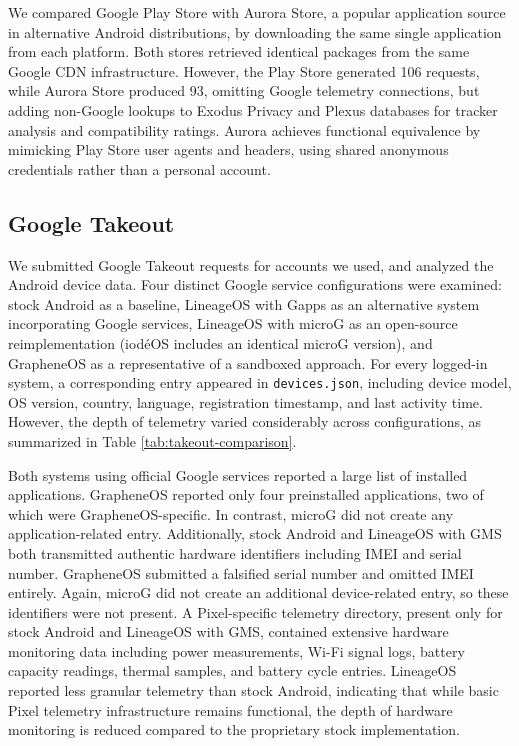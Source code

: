 We compared Google Play Store with Aurora Store, a popular application source in alternative Android distributions, by downloading the same single application from each platform. Both stores retrieved identical packages from the same Google CDN infrastructure. However, the Play Store generated 106 requests, while Aurora Store produced 93, omitting Google telemetry connections, but adding non-Google lookups to Exodus Privacy and Plexus databases for tracker analysis and compatibility ratings. Aurora achieves functional equivalence by mimicking Play Store user agents and headers, using shared anonymous credentials rather than a personal account.

\subsection{Google Takeout}

We submitted Google Takeout requests for accounts we used, and analyzed the Android device data. Four distinct Google service configurations were examined: stock Android as a baseline, LineageOS with Gapps as an alternative system incorporating Google services, LineageOS with microG as an open-source reimplementation (iod\'eOS includes an identical microG version), and GrapheneOS as a representative of a sandboxed approach. For every logged-in system, a corresponding entry appeared in \texttt{devices.json}, including device model, OS version, country, language, registration timestamp, and last activity time. However, the depth of telemetry varied considerably across configurations, as summarized in Table \ref{tab:takeout-comparison}.

Both systems using official Google services reported a large list of installed applications. GrapheneOS reported only four preinstalled applications, two of which were GrapheneOS-specific. In contrast, microG did not create any application-related entry. Additionally, stock Android and LineageOS with GMS both transmitted authentic hardware identifiers including IMEI and serial number. GrapheneOS submitted a falsified serial number and omitted IMEI entirely. Again, microG did not create an additional device-related entry, so these identifiers were not present. A Pixel-specific telemetry directory, present only for stock Android and LineageOS with GMS, contained extensive hardware monitoring data including power measurements, Wi-Fi signal logs, battery capacity readings, thermal samples, and battery cycle entries. LineageOS reported less granular telemetry than stock Android, indicating that while basic Pixel telemetry infrastructure remains functional, the depth of hardware monitoring is reduced compared to the proprietary stock implementation.

